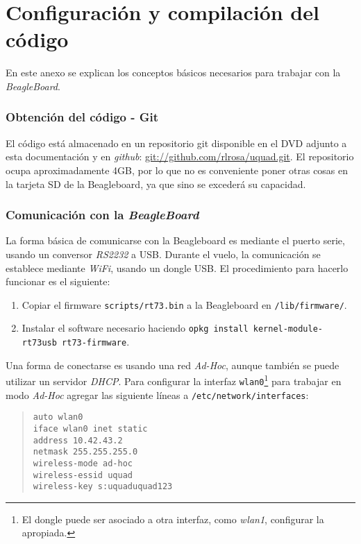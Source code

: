 \documentclass[main]{subfiles}
\begin{document}
\chapter{Configuraci\'on y compilaci\'on del c\'odigo}
\label{chap:anexo-codigo}

En este anexo se explican los conceptos b\'asicos necesarios para trabajar con la \textit{BeagleBoard}.

\subsection{Obtenci\'on del c\'odigo - Git}
\label{sec:codigo:git}

El código está almacenado en un repositorio git disponible en el DVD adjunto a esta documentación y en \textit{github}: \url{git://github.com/rlrosa/uquad.git}. El repositorio ocupa aproximadamente 4GB, por lo que no es conveniente poner otras cosas en la tarjeta SD de la Beagleboard, ya que sino se excederá su capacidad.

\subsection{Comunicación con la \textit{BeagleBoard}}
\label{sec:codigo:comunicacion}

La forma básica de comunicarse con la Beagleboard es mediante el puerto serie, usando un conversor \textit{RS2232} a USB. Durante el vuelo, la comunicación se establece mediante \textit{WiFi}, usando un dongle USB. El procedimiento para hacerlo funcionar es el siguiente:

\begin{enumerate}
\item Copiar el firmware \verb+scripts/rt73.bin+ a la Beagleboard en \verb+/lib/firmware/+.
\item Instalar el software necesario haciendo \newline\verb+opkg install kernel-module-rt73usb rt73-firmware+.
\end{enumerate}

Una forma de conectarse es usando una red \textit{Ad-Hoc}, aunque también se puede utilizar un servidor \textit{DHCP}. Para configurar la interfaz \verb+wlan0+\footnote{El dongle puede ser asociado a otra interfaz, como \textit{wlan1}, configurar la apropiada.} para trabajar en modo \textit{Ad-Hoc} agregar las siguiente líneas a \verb+/etc/network/interfaces+:
\begin{quote}
\begin{verbatim}
auto wlan0
iface wlan0 inet static
address 10.42.43.2
netmask 255.255.255.0
wireless-mode ad-hoc
wireless-essid uquad
wireless-key s:uquaduquad123
\end{verbatim}
\end{quote}
\end{document}
